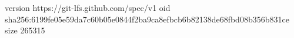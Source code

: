 version https://git-lfs.github.com/spec/v1
oid sha256:6199fe05e59da7c60b05e0844f2ba9ca8efbcb6b82138de68fbd08b356b831ce
size 265315
